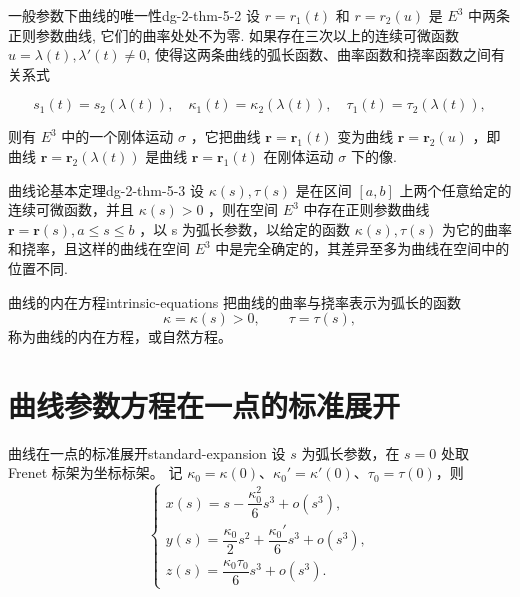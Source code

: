 \begin{theorem}{一般参数下曲线的唯一性}{dg-2-thm-5-2}
设 \(r = r_1(t)\) 和 \(r = r_2(u)\) 是 \(E^3\) 中两条正则参数曲线, 它们的曲率处处不为零. 如果存在三次以上的连续可微函数 \(u = \lambda(t), \lambda'(t) \neq 0\), 使得这两条曲线的弧长函数、曲率函数和挠率函数之间有关系式\par

\begin{equation*}
s _ {1} (t) = s _ {2} (\lambda (t)), \quad \kappa_ {1} (t) = \kappa_ {2} (\lambda (t)), \quad \tau_ {1} (t) = \tau_ {2} (\lambda (t)),
\end{equation*}

则有  \(E^{3}\)  中的一个刚体运动  \(\sigma\) ，它把曲线  \(\boldsymbol{r} = \boldsymbol{r}_{1}(t)\)  变为曲线  \(\boldsymbol{r} = \boldsymbol{r}_{2}(u)\) ，即曲线  \(\boldsymbol{r} = \boldsymbol{r}_{2}(\lambda(t))\)  是曲线  \(\boldsymbol{r} = \boldsymbol{r}_{1}(t)\)  在刚体运动  \(\sigma\)  下的像.
\end{theorem}

\begin{theorem}{曲线论基本定理}{dg-2-thm-5-3}
设  \(\kappa(s), \tau(s)\)  是在区间  \([a, b]\)  上两个任意给定的连续可微函数，并且  \(\kappa(s) > 0\) ，则在空间  \(E^{3}\)  中存在正则参数曲线  \(\boldsymbol{r} = \boldsymbol{r}(s), a \leqslant s \leqslant b\) ，以 s 为弧长参数，以给定的函数  \(\kappa(s), \tau(s)\)  为它的曲率和挠率，且这样的曲线在空间  \(E^{3}\)  中是完全确定的，其差异至多为曲线在空间中的位置不同.
\end{theorem}

\begin{definition}{曲线的内在方程}{intrinsic-equations}
把曲线的曲率与挠率表示为弧长的函数
\[
\kappa=\kappa(s)>0,\qquad\tau=\tau(s),
\]
称为曲线的内在方程，或自然方程。
\end{definition}

\section{曲线参数方程在一点的标准展开}

\begin{proposition}{曲线在一点的标准展开}{standard-expansion}
设 $s$ 为弧长参数，在 $s=0$ 处取 Frenet 标架为坐标标架。
记 $\kappa_0=\kappa(0)$、$\kappa_0'=\kappa'(0)$、$\tau_0=\tau(0)$，则
\[
\begin{cases}
x(s)=s-\dfrac{\kappa_0^2}{6}s^3+o(s^3),\\[4pt]
y(s)=\dfrac{\kappa_0}{2}s^2+\dfrac{\kappa_0'}{6}s^3+o(s^3),\\[4pt]
z(s)=\dfrac{\kappa_0\tau_0}{6}s^3+o(s^3).
\end{cases}
\]
\end{proposition}

